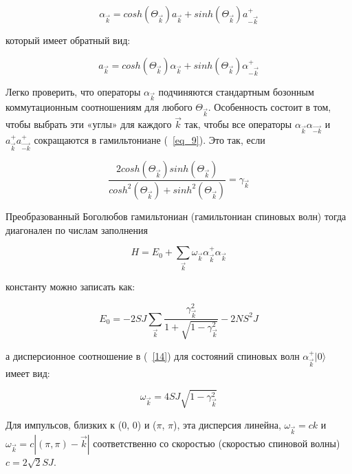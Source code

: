 \documentclass[11pt]{article}
\begin{document}
\begin{equation}
\alpha_{\vec{k}} = cosh(\Theta_{\vec{k}})a_{\vec{k}}+sinh(\Theta_{\vec{k}})a_{-\vec{k}}^{+}
\label{eq_11}
\end{equation}

который имеет обратный вид:

\begin{equation}
a_{\vec{k}} = cosh(\Theta_{\vec{k}})\alpha_{\vec{k}}+sinh(\Theta_{\vec{k}})\alpha_{-\vec{k}}^{+}
\label{eq_12}
\end{equation}

Легко проверить, что операторы $\alpha_{\vec{k}}$ подчиняются стандартным бозонным коммутационным соотношениям для любого $\Theta_{\vec{k}}$. Особенность состоит в том, чтобы выбрать эти «углы» для каждого $\vec{k}$ так, чтобы все операторы $\alpha_{\vec{k}} \alpha_{\vec{-k}}$ и $a_{\vec{k}}^{+} a_{\vec{-k}}^{+}$ сокращаются в гамильтониане (~\ref{eq_9}). Это так, если

\begin{equation}
\frac{2cosh(\Theta_{\vec{k}})sinh(\Theta_{\vec{k}})}
{cosh^2(\Theta_{\vec{k}})+sinh^2(\Theta_{\vec{k}})}
=\gamma_{\vec{k}}
\label{eq_13}
\end{equation}

Преобразованный Боголюбов гамильтониан (гамильтониан спиновых волн) тогда диагонален по числам заполнения

\begin{equation}
H=E_0+\sum\limits_{\vec{k}}\omega_{\vec{k}}\alpha_{\vec{k}}^{+}\alpha_{\vec{k}}
\label{eq_14}
\end{equation}

константу можно записать как:

\begin{equation}
E_0 = -2SJ\sum\limits_{\vec{k}}\frac{\gamma_{\vec{k}}^2}{1+\sqrt{1-\gamma_{\vec{k}}^2}} - 2NS^2J
\label{eq_15}
\end{equation}

а дисперсионное соотношение в (~\ref{14}) для состояний спиновых волн $\alpha_{\vec{k}}^{+}|0\rangle$ имеет вид:

\begin{equation}
\omega_{\vec{k}}=4SJ\sqrt{1-\gamma_{\vec{k}}^2}
\label{eq_16}
\end{equation}

Для импульсов, близких к (0, 0) и ($\pi$, $\pi$), эта дисперсия линейна, $\omega_{\vec{k}}=ck$ и $\omega_{\vec{k}}=c|(\pi,\pi)-\vec{k}|$ соответственно со скоростью (скоростью спиновой волны) $c = 2\sqrt{2}SJ$.
\end{document}
